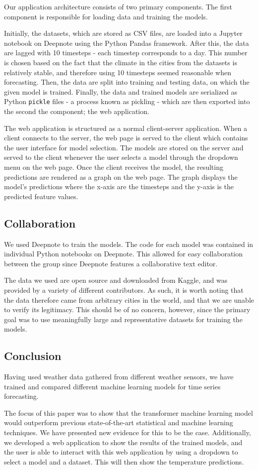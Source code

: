 Our application architecture consists of two primary components.
The first component is responsible for loading data and training the models.

Initially, the datasets, which are stored as CSV files, are loaded into a Jupyter notebook on Deepnote using the Python Pandas framework.
After this, the data are lagged with 10 timesteps - each timestep corresponds to a day.
This number is chosen based on the fact that the climate in the cities from the datasets is relatively stable, and therefore using 10 timesteps seemed reasonable when forecasting.
Then, the data are split into training and testing data, on which the given model is trained. 
Finally, the data and trained models are serialized as Python \texttt{pickle} files - a process known as pickling - which are then exported into the second the component; the web application.

The web application is structured as a normal client-server application.
When a client connects to the server, the web page is served to the client which contains the user interface for model selection.
The models are stored on the server and served to the client whenever the user selects a model through the dropdown menu on the web page.
Once the client receives the model, the resulting predictions are rendered as a graph on the web page.
The graph displays the model's predictions where the x-axis are the timesteps and the y-axis is the predicted feature values.

\subsection{Collaboration}
We used Deepnote\cite{deepnote} to train the models. 
The code for each model was contained in individual Python notebooks on Deepnote.
This allowed for easy collaboration between the group since Deepnote features a collaborative text editor.

The data we used are open source and downloaded from Kaggle\cite{kaggle}, and was provided by a variety of different contributors.
As such, it is worth noting that the data therefore came from arbitrary cities in the world, and that we are unable to verify its legitimacy.
This should be of no concern, however, since the primary goal was to use meaningfully large and representative datasets for training the models.


\subsection{Conclusion}
Having used weather data gathered from different weather sensors, we have trained and compared different machine learning models for time series forecasting.

The focus of this paper was to show that the transformer machine learning model would outperform previous state-of-the-art statistical and machine learning techniques. 
We have presented new evidence for this to be the case.
Additionally, we developed a web application to show the results of the trained models, and the user is able to interact with this web application by using a dropdown to select a model and a dataset. This will then show the temperature predictions.
